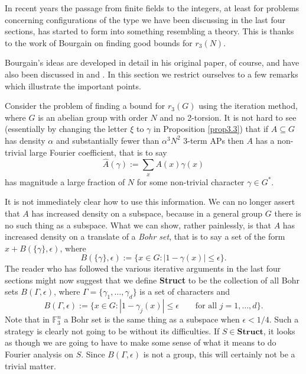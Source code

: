 \documentclass[12pt,a4paper,reqno]{amsart}
\numberwithin{equation}{section}
\theoremstyle{plain}
\theoremstyle{definition}
\renewcommand{\leq}{\leqslant}
\begin{document}
\noindent In recent years the passage from finite fields to the integers, at least for problems concerning configurations of the type we have been discussing in the last four sections, has started to form into something resembling a theory. This is thanks to the work of Bourgain \cite{bourgain2} on finding good bounds for $r_3(N)$. \vspace{11pt}

\noindent Bourgain's ideas are developed in detail in his original paper, of course, and have also been discussed in \cite{green-reg} and \cite{tao-notes}. In this section we restrict ourselves to a few remarks which illustrate the important points.\vspace{11pt}

\noindent Consider the problem of finding a bound for $r_3(G)$ using the iteration method, where $G$ is an abelian group with order $N$ and no 2-torsion. It is not hard to see (essentially by changing the letter $\xi$ to $\gamma$ in Proposition \ref{prop3.3}) that if $A \subseteq G$ has density $\alpha$ and substantially fewer than $\alpha^3 N^2$ 3-term APs then $A$ has a non-trivial large Fourier coefficient, that is to say 
\[ \widehat{A}(\gamma) := \sum_x A(x) \gamma(x)\]
has magnitude a large fraction of $N$ for some non-trivial character $\gamma \in G^{*}$. \vspace{11pt}

\noindent It is not immediately clear how to use this information. We can no longer assert that $A$ has increased density on a subspace, because in a general group $G$ there is no such thing as a subspace. What we can show, rather painlessly, is that $A$ has increased density on a translate of a \textit{Bohr set}, that is to say a set of the form $x + B(\{\gamma\},\epsilon)$, where
\[ B(\{\gamma\},\epsilon) := \{x \in G: |1 - \gamma(x)| \leq \epsilon\}.\]
The reader who has followed the various iterative arguments in the last four sections might now suggest that we define \textbf{Struct} to be the collection of all Bohr sets $B(\Gamma,\epsilon)$, where $\Gamma = \{\gamma_1,\dots,\gamma_d\}$ is a set of characters and 
\[ B(\Gamma,\epsilon) := \{x \in G: |1 - \gamma_j(x)| \leq \epsilon \qquad \mbox{for all $j = 1,\dots,d$}\}.\]
Note that in $\mathbb{F}_3^n$ a Bohr set is the same thing as a subspace when $\epsilon < 1/4$.
Such a strategy is clearly not going to be without its difficulties. If $S \in \mathbf{Struct}$, it looks as though we are going to have to make some sense of what it means to do Fourier analysis on $S$. Since $B(\Gamma,\epsilon)$ is not a group, this will certainly not be a trivial matter. \vspace{11pt}
\end{document}
